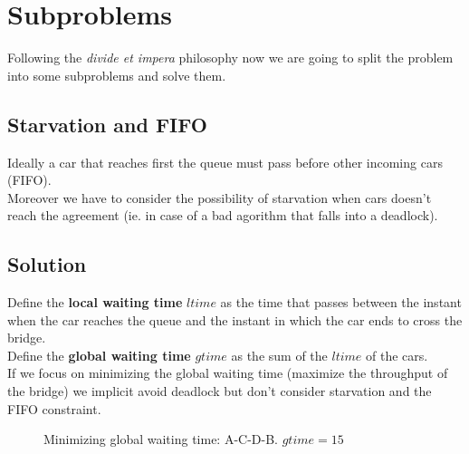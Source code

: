 \section{Subproblems}

Following the \textit{divide et impera} philosophy now we are going to split the problem 
into some subproblems and solve them. 


\subsection{Starvation and FIFO}

Ideally a car that reaches first the queue must pass before other incoming cars (FIFO).\\

Moreover we have to consider the possibility of starvation when 
cars doesn't reach the agreement (ie. in case of a bad agorithm that falls into 
a deadlock).


\subsection{Solution}

Define the \textbf{local waiting time} $ltime$ as the time that passes between the instant when the car reaches 
the queue and the instant in which the car ends to cross the bridge. \\

Define the \textbf{global waiting time} $gtime$ as the sum of the $ltime$ of the cars.\\

If we focus on minimizing the global waiting time (maximize the throughput of the bridge) 
we implicit avoid deadlock but don't consider starvation and the FIFO constraint. 

\begin{figure}
    \centering
    \caption{Minimizing global waiting time: A-C-D-B. $gtime = 15$} \label{fig:1}
\end{figure}

